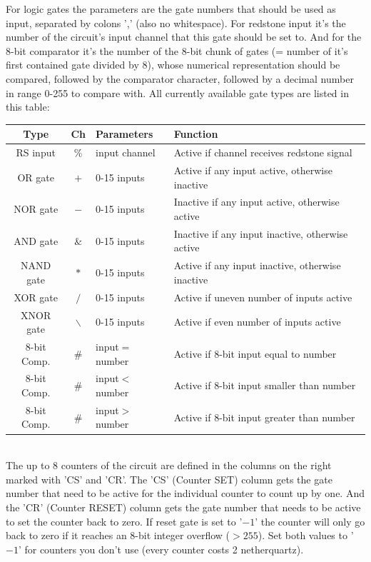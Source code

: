 \documentclass[11pt]{article} %
\begin{document}
For logic gates the parameters are the gate numbers that should be used as input, separated by colons ',' (also no whitespace). For redstone input it's the number of the circuit's input channel that this gate should be set to. And for the 8-bit comparator it's the number of the 8-bit chunk of gates (= number of it's first contained gate divided by 8), whose numerical representation should be compared, followed by the comparator character, followed by a decimal number in range 0-255 to compare with. All currently available gate types are listed in this table:\\
\begin{tabular}{|c|c|l|l|} \hline
\bf Type & \bf Ch & \bf Parameters & \bf Function \\\hline
RS input & $\%$ & input channel & Active if channel receives redstone signal \\\hline
OR gate & $+$ & 0-15 inputs & Active if any input active, otherwise inactive \\\hline
NOR gate & $-$ & 0-15 inputs & Inactive if any input active, otherwise active \\\hline
AND gate & $\&$ & 0-15 inputs & Inactive if any input inactive, otherwise active \\\hline
NAND gate & $*$ & 0-15 inputs & Active if any input inactive, otherwise inactive \\\hline
XOR gate & $/$ & 0-15 inputs & Active if uneven number of inputs active \\\hline
XNOR gate & $\backslash$ & 0-15 inputs & Active if even number of inputs active \\\hline
8-bit Comp. & $\#$ & input$=$number & Active if 8-bit input equal to number \\\hline
8-bit Comp. & $\#$ & input$<$number & Active if 8-bit input smaller than number \\\hline
8-bit Comp. & $\#$ & input$>$number & Active if 8-bit input greater than number \\\hline
\end{tabular}\\

The up to 8 counters of the circuit are defined in the columns on the right marked with 'CS' and 'CR'. The 'CS' (Counter SET) column gets the gate number that need to be active for the individual counter to count up by one. And the 'CR' (Counter RESET) column gets the gate number that needs to be active to set the counter back to zero. If reset gate is set to '$-1$' the counter will only go back to zero if it reaches an 8-bit integer overflow ($>255$). Set both values to '$-1$' for counters you don't use (every counter costs 2 netherquartz).
\end{document}
